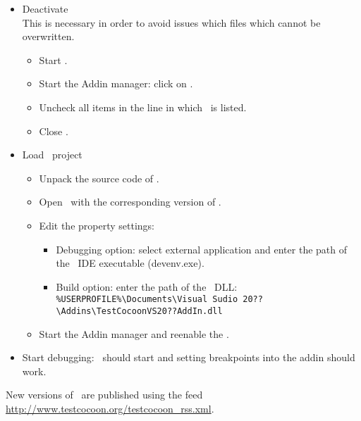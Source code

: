 \begin{itemize}
  \item Deactivate \VisualStudioVsAddIn\\
        This is necessary in order to avoid issues which files which cannot be overwritten.
        \begin{itemize}
          \item Start \VisualStudio.
          \item Start the Addin manager: click on .
          \item Uncheck all items in the line in which \TestCocoon\ is listed.
          \item Close \VisualStudio.
        \end{itemize}
  \item Load \VisualStudioVsAddIn\ project\\
        \begin{itemize}
          \item Unpack the source code of \TestCocoon.
          \item Open \VisualStudioVsAddIn\ with the corresponding version of \VisualStudio.
          \item Edit the property settings:
          \begin{itemize}
            \item Debugging option: select external application and enter the path of the \VisualStudio\ IDE executable (devenv.exe).
            \item Build option: enter the path of the \VisualStudioVsAddIn\ DLL: \verb$%USERPROFILE%\Documents\Visual Sudio 20??\Addins\TestCocoonVS20??AddIn.dll$
          \end{itemize}
          \item Start the Addin manager and reenable the \VisualStudioVsAddIn.

        \end{itemize}
      \item Start debugging: \VisualStudio\ should start and setting breakpoints into the addin should work.
     
\end{itemize}


New versions of \TestCocoon\ are published using the  feed \url{http://www.testcocoon.org/testcocoon_rss.xml}.
